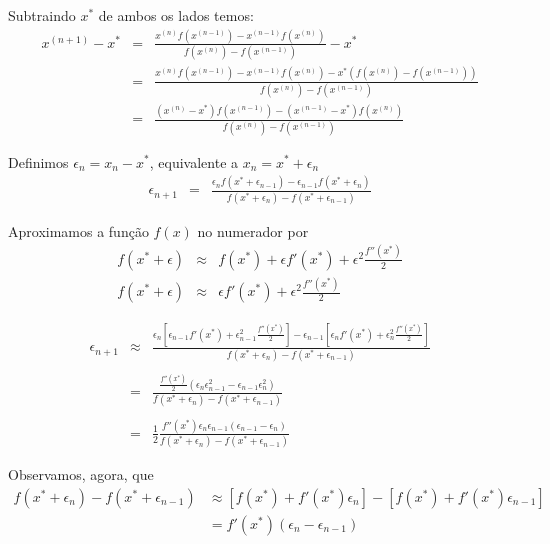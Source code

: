 \documentclass[main.tex]{subfiles}
\begin{document}
Subtraindo $x^*$ de ambos os lados temos:
\begin{eqnarray*}
x^{(n+1)}-x^*
 &=&\frac{x^{(n)} f(x^{(n-1)})-x^{(n-1)}f(x^{(n)})}{f(x^{(n)})-f(x^{(n-1)})}-x^*\\
 &=&\frac{x^{(n)} f(x^{(n-1)})-x^{(n-1)}f(x^{(n)})-x^*\left(f(x^{(n)})-f(x^{(n-1)})\right)}{f(x^{(n)})-f(x^{(n-1)})}\\
 &=&\frac{(x^{(n)}-x^*) f(x^{(n-1)})-(x^{(n-1)}-x^*)f(x^{(n)})}{f(x^{(n)})-f(x^{(n-1)})}
\end{eqnarray*}

Definimos $\epsilon_n=x_n-x^*$, equivalente a $x_n=x^*+\epsilon_n$
\begin{eqnarray*}
\epsilon_{n+1}
 &=&\frac{\epsilon_n f(x^*+\epsilon_{n-1})-\epsilon_{n-1}f(x^*+\epsilon_n)}{f(x^*+\epsilon_n)-f(x^*+\epsilon_{n-1})}
\end{eqnarray*}

Aproximamos a função $f(x)$ no numerador por
\begin{eqnarray*}
f(x^*+\epsilon)&\approx& f(x^*)+\epsilon f'(x^*) + \epsilon^2 \frac{f''(x^*)}{2}\\
f(x^*+\epsilon)&\approx& \epsilon f'(x^*) + \epsilon^2 \frac{f''(x^*)}{2}
\end{eqnarray*}

\begin{eqnarray*}
\epsilon_{n+1}
 &\approx&\frac{\epsilon_n \left[\epsilon_{n-1} f'(x^*) + \epsilon_{n-1}^2 \frac{f''(x^*)}{2}\right]-\epsilon_{n-1}\left[\epsilon_{n} f'(x^*) + \epsilon_{n}^2 \frac{f''(x^*)}{2}\right]}{f(x^*+\epsilon_n)-f(x^*+\epsilon_{n-1})}\\
~\\ &=&\frac{\frac{f''(x^*)}{2}\left(\epsilon_{n}\epsilon_{n-1}^2-\epsilon_{n-1}\epsilon_{n}^2\right)}{f(x^*+\epsilon_n)-f(x^*+\epsilon_{n-1})}\\
~\\ &=&\frac{1}{2}\frac{{f''(x^*)}\epsilon_{n}\epsilon_{n-1}\left(\epsilon_{n-1}-\epsilon_{n}\right)}{f(x^*+\epsilon_n)-f(x^*+\epsilon_{n-1})}
\end{eqnarray*}

Observamos, agora, que
\begin{equation}
  \begin{split}
  f(x^*+\epsilon_n)-f(x^*+\epsilon_{n-1}) &\approx \left[f(x^*)+f'(x^*)\epsilon_n\right]-\left[f(x^*)+f'(x^*)\epsilon_{n-1}\right] \\
  &=f'(x^*)(\epsilon_n-\epsilon_{n-1})  
  \end{split}  
\end{equation}
\end{document}
